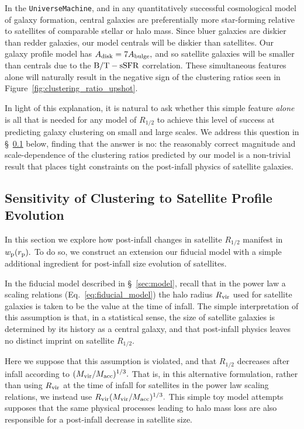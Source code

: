 \documentclass[usenatbib,usegraphicx,letterpaper]{mn2e}
\newcommand{\rhalf}{R_{1/2}}
\newcommand{\adisk}{A_{\rm disk}}
\newcommand{\abulge}{A_{\rm bulge}}
\newcommand{\rvir}{R_{\rm vir}}
\newcommand{\bt}{{\rm B/T}}
\newcommand{\ssfr}{{\rm sSFR}}
\newcommand{\mvir}{M_{\rm vir}}
\newcommand{\macc}{M_{\rm acc}}
\newcommand{\rproj}{r_{\rm p}}
\newcommand{\wproj}{w_{\rm p}}
\begin{document}
In the {\tt UniverseMachine}, and in any quantitatively successful cosmological model of galaxy formation, central galaxies are preferentially more star-forming relative to satellites of comparable stellar or halo mass. Since bluer galaxies are diskier than redder galaxies, our model centrals will be diskier than satellites. Our galaxy profile model has $\adisk=7\abulge,$ and so satellite galaxies will be smaller than centrals due to the $\bt-\ssfr$ correlation. These simultaneous features alone will naturally result in the negative sign of the clustering ratios seen in Figure~\ref{fig:clustering_ratio_upshot}.

In light of this explanation, it is natural to ask whether this simple feature {\em alone} is all that is needed for any model of $\rhalf$ to achieve this level of success at predicting galaxy clustering on small and large scales. We address this question in \S~\ref{subsec:tests2} below, finding that the answer is no: the reasonably correct magnitude and scale-dependence of the clustering ratios predicted by our model is a non-trivial result that places tight constraints on the post-infall physics of satellite galaxies.

\subsection{Sensitivity of Clustering to Satellite Profile Evolution}
\label{subsec:tests2}

In this section we explore how post-infall changes in satellite $\rhalf$ manifest in $\wproj(\rproj).$ To do so, we construct an extension our fiducial model with a simple additional ingredient for post-infall size evolution of satellites.

In the fiducial model described in \S~\ref{sec:model}, recall that in the power law a scaling relations (Eq.~\ref{eq:fiducial_model}) the halo radius $\rvir$ used for satellite galaxies is taken to be the value at the time of infall. The simple interpretation of this assumption is that, in a statistical sense, the size of satellite galaxies is determined by its history as a central galaxy, and that post-infall physics leaves no distinct imprint on satellite $\rhalf.$

Here we suppose that this assumption is violated, and that $\rhalf$ decreases after infall according to $(\mvir/\macc)^{1/3}.$ That is, in this alternative formulation, rather than using $\rvir$ at the time of infall for satellites in the power law scaling relations, we instead use $\rvir(\mvir/\macc)^{1/3}.$ This simple toy model attempts supposes that the same physical processes leading to halo mass loss are also responsible for a post-infall decrease in satellite size.
\end{document}
